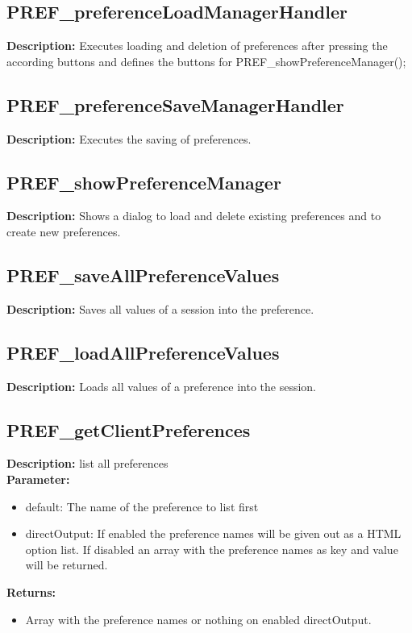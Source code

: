 \subsection{PREF\_preferenceLoadManagerHandler}
\textbf{Description:} Executes loading and deletion of preferences after pressing the according buttons and defines the buttons for PREF\_showPreferenceManager();\\

\subsection{PREF\_preferenceSaveManagerHandler}
\textbf{Description:} Executes the saving of preferences.\\

\subsection{PREF\_showPreferenceManager}
\textbf{Description:} Shows a dialog to load and delete existing preferences and to create new preferences.\\

\subsection{PREF\_saveAllPreferenceValues}
\textbf{Description:} Saves all values of a session into the preference.\\

\subsection{PREF\_loadAllPreferenceValues}
\textbf{Description:} Loads all values of a preference into the session.\\

\subsection{PREF\_getClientPreferences}
\textbf{Description:} list all preferences\\
\textbf{Parameter:}
\begin{itemize}
\item default: The name of the preference to list first
\item directOutput: If enabled the preference names will be given out as a HTML option list. If disabled an array with the preference names as key and value will be returned.
\end{itemize}
\textbf{Returns:}
\begin{itemize}
\item Array with the preference names or nothing on enabled directOutput.
\end{itemize}

